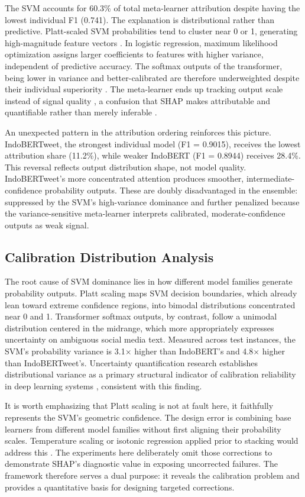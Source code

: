 \documentclass[conference]{IEEEtran}
\begin{document}
The SVM accounts for 60.3\% of total meta-learner attribution despite having the lowest individual F1 (0.741). The explanation is distributional rather than predictive. Platt-scaled SVM probabilities tend to cluster near 0 or 1, generating high-magnitude feature vectors \cite{b15}. In logistic regression, maximum likelihood optimization assigns larger coefficients to features with higher variance, independent of predictive accuracy. The softmax outputs of the transformer, being lower in variance and better-calibrated are therefore underweighted despite their individual superiority \cite{b15,b18}. The meta-learner ends up tracking output scale instead of signal quality \cite{b17,b18}, a confusion that SHAP makes attributable and quantifiable rather than merely inferable \cite{b20}.

An unexpected pattern in the attribution ordering reinforces this picture. IndoBERTweet, the strongest individual model (F1 = 0.9015), receives the lowest attribution share (11.2\%), while weaker IndoBERT (F1 = 0.8944) receives 28.4\%. This reversal reflects output distribution shape, not model quality. IndoBERTweet's more concentrated attention produces smoother, intermediate-confidence probability outputs. These are doubly disadvantaged in the ensemble: suppressed by the SVM's high-variance dominance and further penalized because the variance-sensitive meta-learner interprets calibrated, moderate-confidence outputs as weak signal.

\subsection{Calibration Distribution Analysis}

The root cause of SVM dominance lies in how different model families generate probability outputs. Platt scaling \cite{b1} maps SVM decision boundaries, which already lean toward extreme confidence regions, into bimodal distributions concentrated near 0 and 1. Transformer softmax outputs, by contrast, follow a unimodal distribution centered in the midrange, which more appropriately expresses uncertainty on ambiguous social media text. Measured across test instances, the SVM's probability variance is 3.1$\times$ higher than IndoBERT's and 4.8$\times$ higher than IndoBERTweet's. Uncertainty quantification research establishes distributional variance as a primary structural indicator of calibration reliability in deep learning systems \cite{b23}, consistent with this finding.

It is worth emphasizing that Platt scaling is not at fault here, it faithfully represents the SVM's geometric confidence. The design error is combining base learners from different model families without first aligning their probability scales. Temperature scaling or isotonic regression applied prior to stacking would address this \cite{b15}. The experiments here deliberately omit those corrections to demonstrate SHAP's diagnostic value in exposing uncorrected failures. The framework therefore serves a dual purpose: it reveals the calibration problem and provides a quantitative basis for designing targeted corrections.
\end{document}
